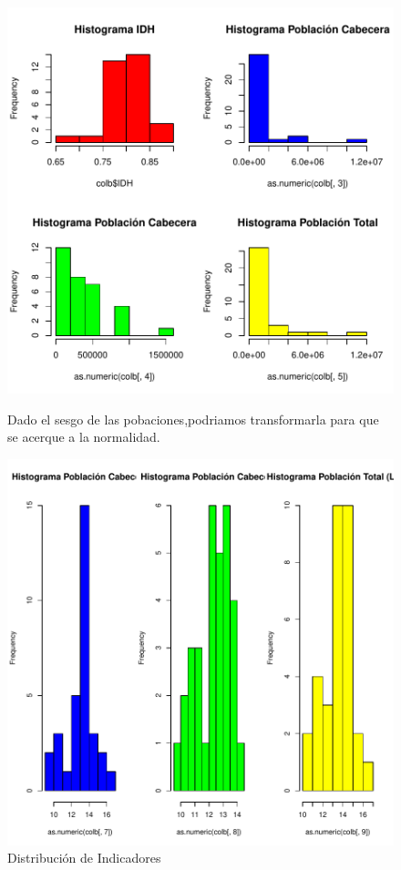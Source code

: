 \documentclass{article}
\begin{document}
\begin{figure}[h]
\centering
\includegraphics{EntregaFinal-barplots}
  
  
Dado el sesgo de las pobaciones,podriamos transformarla para que se acerque a la normalidad.

\begin{adjustbox}{width=9cm,height=3cm,clip,trim=1.5cm 0.5cm 0cm 1.5cm}
\includegraphics{EntregaFinal-barplots2}
\end{adjustbox}

 \caption{Distribución de Indicadores}
 \label{barplots}
 \end{figure}
 
\end{document}
